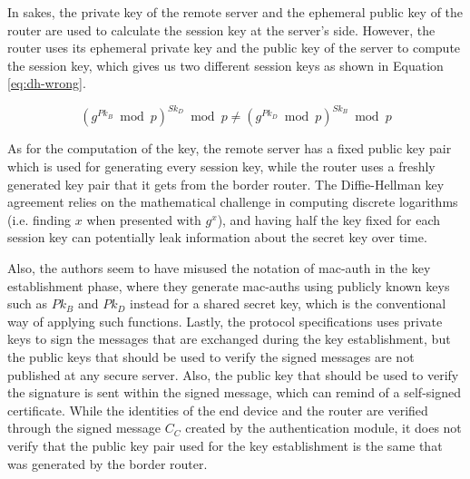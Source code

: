 In \gls{sakes}, the private key of the remote server and the ephemeral public key of the router are used to calculate the session key at the server's side. However, the router uses its ephemeral private key and the public key of the server to compute the session key, which gives us two different session keys as shown in Equation \ref{eq:dh-wrong}.

\begin{equation}
\label{eq:dh-wrong}
(g^{Pk_B} \bmod p)^{Sk_D} \bmod p \neq (g^{Pk_D} \bmod p)^{Sk_B} \bmod p
\end{equation}

As for the computation of the key, the remote server has a fixed public key pair which is used for generating every session key, while the router uses a freshly generated key pair that it gets from the border router. The Diffie-Hellman key agreement relies on the mathematical challenge in computing discrete logarithms (i.e. finding $x$ when presented with $g^x$), and having half the key fixed for each session key can potentially leak information about the secret key over time.

Also, the authors seem to have misused the notation of \gls{mac-auth} in the key establishment phase, where they generate \gls{mac-auth}s using publicly known keys such as $Pk_B$ and $Pk_D$ instead for a shared secret key, which is the conventional way of applying such functions. Lastly, the protocol specifications uses private keys to sign the messages that are exchanged during the key establishment, but the public keys that should be used to verify the signed messages are not published at any secure server. Also, the public key that should be used to verify the signature is sent within the signed message, which can remind of a self-signed certificate. While the identities of the end device and the router are verified through the signed message $C_C$ created by the authentication module, it does not verify that the public key pair used for the key establishment is the same that was generated by the border router.

